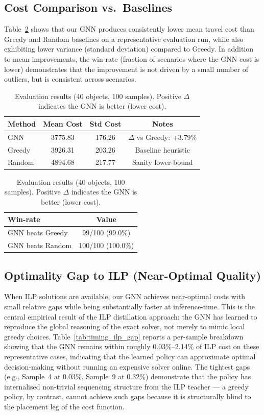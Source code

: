 \documentclass[conference]{IEEEtran}
\begin{document}
\subsection{Cost Comparison vs.\ Baselines}
Table~\ref{tab:results_40obj_100} shows that our GNN produces consistently lower mean travel cost than Greedy and Random baselines on a representative evaluation run, while also exhibiting lower variance (standard deviation) compared to Greedy. 
In addition to mean improvements, the win-rate (fraction of scenarios where the GNN cost is lower) demonstrates that the improvement is not driven by a small number of outliers, but is consistent across scenarios.

\begin{table}[htbp]
\caption{Evaluation results (40 objects, 100 samples). Positive $\Delta$ indicates the GNN is better (lower cost).}
\label{tab:results_40obj_100}
\centering
\begin{tabular}{|l|c|c|c|}
\hline
\textbf{Method} & \textbf{Mean Cost} & \textbf{Std Cost} & \textbf{Notes} \\
\hline
GNN & 3775.83 & 176.26 & $\Delta$ vs Greedy: +3.79\% \\
Greedy & 3926.31 & 203.26 & Baseline heuristic \\
Random & 4894.68 & 217.77 & Sanity lower-bound \\
\hline
\end{tabular}
\vspace{2mm}

\begin{tabular}{|l|c|}
\hline
\textbf{Win-rate} & \textbf{Value} \\
\hline
GNN beats Greedy & 99/100 (99.0\%) \\
GNN beats Random & 100/100 (100.0\%) \\
\hline
\end{tabular}
\end{table}

\subsection{Optimality Gap to ILP (Near-Optimal Quality)}
When ILP solutions are available, our GNN achieves near-optimal costs with small relative gaps while being substantially faster at inference-time. This is the central empirical result of the ILP distillation approach: the GNN has learned to reproduce the global reasoning of the exact solver, not merely to mimic local greedy choices.
Table~\ref{tab:timing_ilp_gap} reports a per-sample breakdown showing that the GNN remains within roughly 0.03\%--2.14\% of ILP cost on these representative cases, indicating that the learned policy can approximate optimal decision-making without running an expensive solver online. The tightest gaps (e.g., Sample~4 at 0.03\%, Sample~9 at 0.32\%) demonstrate that the policy has internalised non-trivial sequencing structure from the ILP teacher --- a greedy policy, by contrast, cannot achieve such gaps because it is structurally blind to the placement leg of the cost function.
\end{document}
